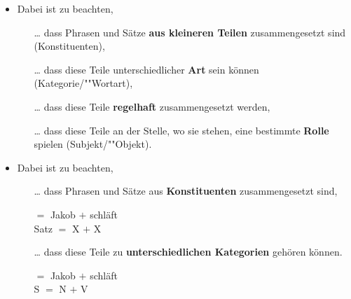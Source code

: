 \begin{frame}

\begin{itemize}

	\item Dabei ist zu beachten,
	
	\begin{itemize}
		\item[\dots] dass Phrasen und Sätze \textbf{aus kleineren Teilen} zusammengesetzt sind (Konstituenten),
		\item[]
		\item [\dots] dass diese Teile unterschiedlicher \textbf{Art} sein können (Kategorie/""Wortart),
		\item[]
		\item [\dots] dass diese Teile \textbf{regelhaft} zusammengesetzt werden,
		\item[]
		\item[\dots] dass diese Teile an der Stelle, wo sie stehen, eine bestimmte \textbf{Rolle} spielen (Subjekt/""Objekt).
 		
	\end{itemize}
	
\end{itemize}

\end{frame}


\begin{frame}

\begin{itemize}
\item Dabei ist zu beachten, 

\begin{itemize}
	\item [\dots] dass Phrasen und Sätze aus \textbf{Konstituenten} zusammengesetzt sind,

	\ea
	 $=$ Jakob $+$ schläft\\
	Satz $=$ X $+$ X \\
	\z

\pause

	\item [\dots] dass diese Teile zu \textbf{unterschiedlichen Kategorien} gehören können.

	\ea 
	 $=$ Jakob $+$ schläft\\
	S $=$ N $+$ V \\
	\z

\end{itemize}

\end{itemize}

\end{frame}


